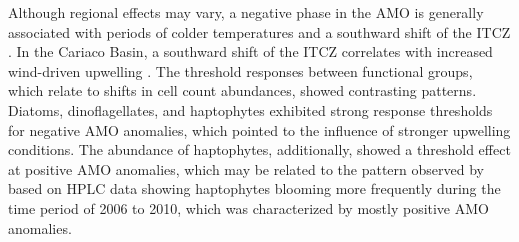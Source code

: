 \documentclass[draft]{agujournal2019}
\begin{document}
    Although regional effects may vary, a negative phase in the AMO is generally associated with periods of colder temperatures and a southward shift of the ITCZ \cite{knight_climate_2006, colna2017latitudinal}. In the Cariaco Basin, a southward shift of the ITCZ correlates with increased wind-driven upwelling \cite{taylor_ecosystem_2012}. The threshold responses between functional groups, which relate to shifts in cell count abundances, showed contrasting patterns. Diatoms, dinoflagellates, and haptophytes exhibited strong response thresholds for negative AMO anomalies, which pointed to the influence of stronger upwelling conditions. The abundance of haptophytes, additionally, showed a threshold effect at positive AMO anomalies, which may be related to the pattern observed by  based on HPLC data showing haptophytes blooming more frequently during the time period of 2006 to 2010, which was characterized by mostly positive AMO anomalies.
    
\end{document}
